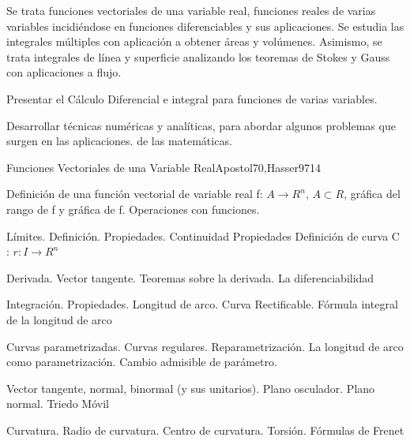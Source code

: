 \begin{syllabus}


\begin{justification}
Se trata funciones vectoriales de una variable real, funciones reales de varias variables incidiéndose en funciones diferenciables y sus aplicaciones. Se estudia las integrales múltiples con aplicación a obtener áreas y volúmenes.
Asimismo, se trata integrales de línea y superficie analizando los teoremas de Stokes y Gauss con aplicaciones a flujo.
\end{justification}

\begin{goals}
\item  Presentar el Cálculo Diferencial e integral para funciones de varias variables.
\item  Desarrollar técnicas numéricas y analíticas, para abordar algunos problemas que surgen en las aplicaciones. de las matemáticas.
\end{goals}

\begin{outcomes}
\end{outcomes}

\begin{unit}{Funciones Vectoriales de una Variable Real}{Apostol70,Hasser97}{14}
   \begin{topics}
	\item  Definición de una función vectorial de variable real f: $A \rightarrow R^n$, $A \subset R$, gráfica del rango de f y gráfica de f. Operaciones con funciones.
	\item Límites. Definición. Propiedades. Continuidad  Propiedades Definición de curva C : $r : I \rightarrow R^n$
	\item  Derivada. Vector tangente. Teoremas sobre la derivada. La diferenciabilidad
	\item  Integración. Propiedades. Longitud de arco. Curva Rectificable. Fórmula integral de la longitud de arco
	\item  Curvas parametrizadas. Curvas regulares. Reparametrización. La longitud de arco como parametrización. Cambio admisible de parámetro.
	\item  Vector tangente, normal, binormal (y sus unitarios). Plano osculador. Plano normal. Triedo Móvil
	\item Curvatura. Radio de curvatura.  Centro de curvatura. Torsión. Fórmulas de Frenet
   \end{topics}


\end{unit}
\end{syllabus}
